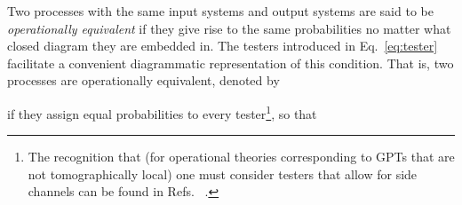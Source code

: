 \documentclass[10pt,twocolumn,aps,groupedaddress,nofootinbib]{revtex4}
\begin{document}
Two processes with the same input systems and output systems are said to be {\em operationally equivalent} if they give rise to the same probabilities no matter what closed diagram they are embedded in.  The testers introduced in Eq.~\eqref{eq:tester} facilitate a convenient diagrammatic representation of this condition.
That is, two processes are operationally equivalent, denoted by
\beq
{}
\eeq
if they assign equal probabilities to every tester\footnote{The recognition that (for operational theories corresponding to GPTs that are not tomographically local) one must consider testers that allow for side channels can be found in Refs.~\cite{hardy2011reformulating,chiribella2014dilation,chiribella2016quantum} .}, so that
\beq
\forall \tau  \ \
\end{document}
